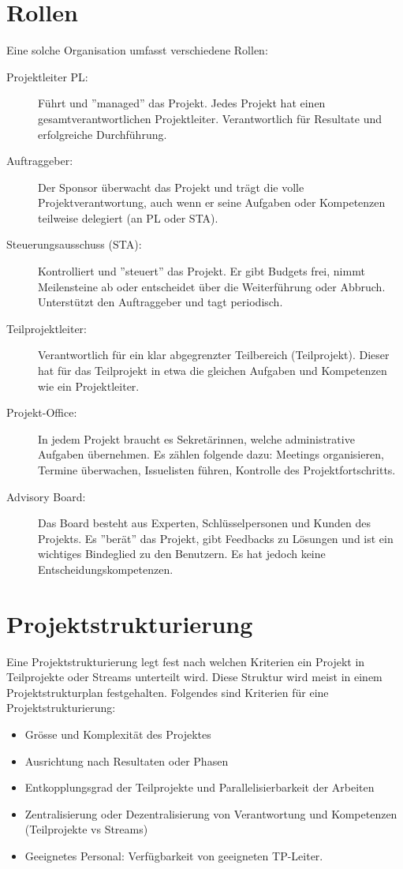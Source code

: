 \section{Rollen}
Eine solche Organisation umfasst verschiedene Rollen:
\begin{description}
	\item[Projektleiter PL:] Führt und ''managed'' das Projekt. Jedes Projekt hat einen gesamtverantwortlichen Projektleiter. Verantwortlich für Resultate und erfolgreiche Durchführung.
	\item[Auftraggeber:] Der Sponsor überwacht das Projekt und trägt die volle Projektverantwortung, auch wenn er seine Aufgaben oder Kompetenzen teilweise delegiert (an PL oder STA).
	\item[Steuerungsausschuss (STA):] Kontrolliert und ''steuert'' das Projekt. Er gibt Budgets frei, nimmt Meilensteine ab oder entscheidet über die Weiterführung oder Abbruch. Unterstützt den Auftraggeber und tagt periodisch.
	\item[Teilprojektleiter:] Verantwortlich für ein klar abgegrenzter Teilbereich (Teilprojekt). Dieser hat für das Teilprojekt in etwa die gleichen Aufgaben und Kompetenzen wie ein Projektleiter.
	\item[Projekt-Office:] In jedem Projekt braucht es Sekretärinnen, welche administrative Aufgaben übernehmen. Es zählen folgende dazu: Meetings organisieren, Termine überwachen, Issuelisten führen, Kontrolle des Projektfortschritts.
	\item[Advisory Board:] Das Board besteht aus Experten, Schlüsselpersonen und Kunden des Projekts. Es ''berät'' das Projekt, gibt Feedbacks zu Lösungen und ist ein wichtiges Bindeglied zu den Benutzern. Es hat jedoch keine Entscheidungskompetenzen.
\end{description}

\section{Projektstrukturierung}
\label{sec:projektstrukturierung}
Eine Projektstrukturierung legt fest nach welchen Kriterien ein Projekt in Teilprojekte oder Streams unterteilt wird. Diese Struktur wird meist in einem Projektstrukturplan festgehalten. Folgendes sind Kriterien für eine Projektstrukturierung:
\begin{itemize}
	\item Grösse und Komplexität des Projektes
	\item Ausrichtung nach Resultaten oder Phasen
	\item Entkopplungsgrad der Teilprojekte und Parallelisierbarkeit der Arbeiten
	\item Zentralisierung oder Dezentralisierung von Verantwortung und Kompetenzen (Teilprojekte vs Streams)
	\item Geeignetes Personal: Verfügbarkeit von geeigneten TP-Leiter.
\end{itemize}

